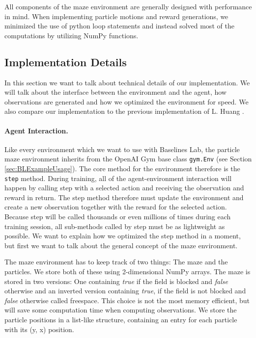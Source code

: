 All components of the maze environment are generally designed with performance in mind. When implementing particle motions and reward generations, we minimized the use of python loop statements and instead solved most of the computations by utilizing NumPy \cite{oliphant2006guide} functions.

\subsection{Implementation Details} \label{sec:MazeImplementationDetails}
In this section we want to talk about technical details of our implementation. We will talk about the interface between the environment and the agent, how observations are generated and how we optimized the environment for speed. We also compare our implementation to the previous implementation of L. Huang \cite{huangMazeGithub}.

\paragraph{Agent Interaction.}
Like every environment which we want to use with Baselines Lab, the particle maze environment inherits from the OpenAI Gym base class \texttt{gym.Env} (see Section \ref{sec:BLExampleUsage}). The core method for the environment therefore is the \texttt{step} method. During training, all of the agent-environment interaction will happen by calling step with a selected action and receiving the observation and reward in return. The step method therefore must update the environment and create a new observation together with the reward for the selected action. Because step will be called thousands or even millions of times during each training session, all sub-methods called by step must be as lightweight as possible. We want to explain how we optimized the step method in a moment, but first we want to talk about the general concept of the maze environment.

The maze environment has to keep track of two things: The maze and the particles. We store both of these using 2-dimensional NumPy arrays. The maze is stored in two versions: One containing \textit{true} if the field is blocked and \textit{false} otherwise and an inverted version containing \textit{true}, if the field is not blocked and \textit{false} otherwise called freespace. This choice is not the most memory efficient, but will save some computation time when computing observations. We store the particle positions in a list-like structure, containing an entry for each particle with its (y, x) position. 

